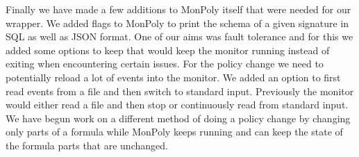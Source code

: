 Finally we have made a few additions to MonPoly itself that were needed for our wrapper.
We added flags to MonPoly to print the schema of a given signature in SQL as well as JSON format.
One of our aims was fault tolerance and for this we added some options to keep that would keep the monitor running instead of exiting when encountering certain issues.
For the policy change we need to potentially reload a lot of events into the monitor.
We added an option to first read events from a file and then switch to standard input.
Previously the monitor would either read a file and then stop or continuously read from standard input.
We have begun work on a different method of doing a policy change by changing only parts of a formula while MonPoly keeps running and can keep the state of the formula parts that are unchanged.


